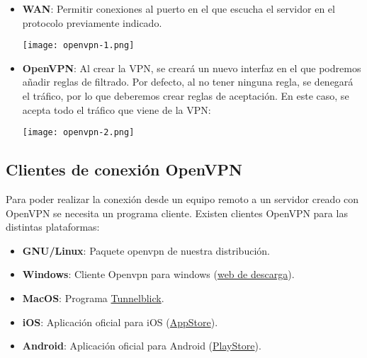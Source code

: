 \begin{itemize}
    \item \textbf{WAN}: Permitir conexiones al puerto en el que escucha el servidor en el protocolo previamente indicado.



    \begin{center}
        \texttt{[image: openvpn-1.png]}
    \end{center}

    \item \textbf{OpenVPN}: Al crear la VPN, se creará un nuevo interfaz en el que podremos añadir reglas de filtrado. Por defecto, al no tener ninguna regla, se denegará el tráfico, por lo que deberemos crear reglas de aceptación. En este caso, se acepta todo el tráfico que viene de la VPN:
    \begin{center}
        \texttt{[image: openvpn-2.png]}
    \end{center}
\end{itemize}


\subsection{Clientes de conexión OpenVPN}
Para poder realizar la conexión desde un equipo remoto a un servidor creado con OpenVPN se necesita un programa cliente. Existen clientes OpenVPN para las distintas plataformas:

\begin{itemize}
    \item \textbf{GNU/Linux}: Paquete openvpn de nuestra distribución.
    \item \textbf{Windows}: Cliente Openvpn para windows (\href{https://openvpn.net/community-downloads/}{web de descarga}).
    \item \textbf{MacOS}: Programa \href{https://tunnelblick.net/}{Tunnelblick}.
    \item \textbf{iOS}: Aplicación oficial para iOS (\href{https://apps.apple.com/es/app/openvpn-connect/id590379981}{AppStore}).
    \item \textbf{Android}: Aplicación oficial para Android (\href{https://play.google.com/store/apps/details?id=net.openvpn.openvpn}{PlayStore}).
\end{itemize}

